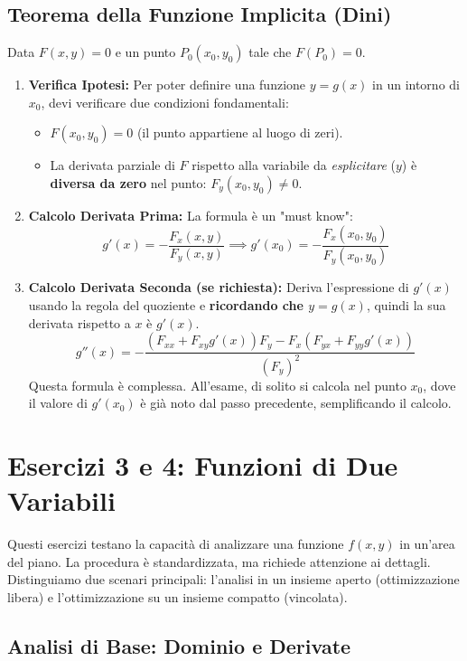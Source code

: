 \documentclass[a4paper, 12pt]{article}
\begin{document}
\subsection{Teorema della Funzione Implicita (Dini)}
Data $F(x,y)=0$ e un punto $P_0(x_0,y_0)$ tale che $F(P_0)=0$. 
\begin{enumerate}
    \item \textbf{Verifica Ipotesi:} Per poter definire una funzione $y=g(x)$ in un intorno di $x_0$, devi verificare due condizioni fondamentali: 
    \begin{itemize}
        \item $F(x_0, y_0) = 0$ (il punto appartiene al luogo di zeri). 
        \item La derivata parziale di $F$ rispetto alla variabile da \textit{esplicitare} ($y$) è \textbf{diversa da zero} nel punto: $F_y(x_0,y_0) \neq 0$. 
    \end{itemize}
    \item \textbf{Calcolo Derivata Prima:} La formula è un "must know": 
    \[ g'(x) = -\frac{F_x(x,y)}{F_y(x,y)} \implies g'(x_0) = -\frac{F_x(x_0,y_0)}{F_y(x_0,y_0)} \]
    \item \textbf{Calcolo Derivata Seconda (se richiesta):} Deriva l'espressione di $g'(x)$ usando la regola del quoziente e \textbf{ricordando che $y=g(x)$}, quindi la sua derivata rispetto a $x$ è $g'(x)$. 
    \[ g''(x) = -\frac{(F_{xx} + F_{xy}g'(x))F_y - F_x(F_{yx} + F_{yy}g'(x))}{(F_y)^2} \]
    Questa formula è complessa. All'esame, di solito si calcola nel punto $x_0$, dove il valore di $g'(x_0)$ è già noto dal passo precedente, semplificando il calcolo. 
\end{enumerate}


\section{Esercizi 3 e 4: Funzioni di Due Variabili}
Questi esercizi testano la capacità di analizzare una funzione $f(x,y)$ in un'area del piano. La procedura è standardizzata, ma richiede attenzione ai dettagli. Distinguiamo due scenari principali: l'analisi in un insieme aperto (ottimizzazione libera) e l'ottimizzazione su un insieme compatto (vincolata).

\subsection{Analisi di Base: Dominio e Derivate}
\end{document}
